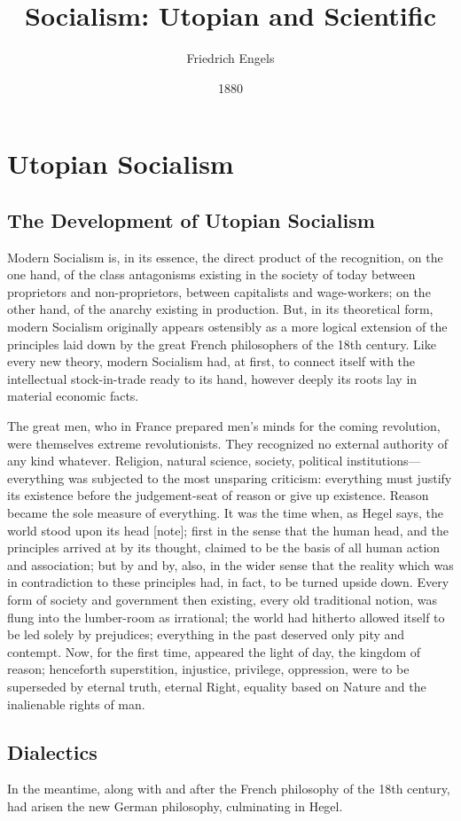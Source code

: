 \documentclass[oneside, 12pt]{book}
\title{Socialism: Utopian and Scientific}
\author{Friedrich Engels}
\date{1880}
\begin{document}
\maketitle

\tableofcontents

\part{Utopian Socialism}

\chapter{The Development of Utopian Socialism}

Modern Socialism is, in its essence, the direct product of the recognition, on
the one hand, of the class antagonisms existing in the society of today between
proprietors and non-proprietors, between capitalists and wage-workers; on the
other hand, of the anarchy existing in production. But, in its theoretical form,
modern Socialism originally appears ostensibly as a more logical extension of
the principles laid down by the great French philosophers of the 18th century.
Like every new theory, modern Socialism had, at first, to connect itself with
the intellectual stock-in-trade ready to its hand, however deeply its roots lay
in material economic facts.

The great men, who in France prepared men's minds for the coming revolution,
were themselves extreme revolutionists. They recognized no external authority of
any kind whatever. Religion, natural science, society, political
institutions---everything was subjected to the most unsparing criticism:
everything must justify its existence before the judgement-seat of reason or
give up existence. Reason became the sole measure of everything. It was the time
when, as Hegel says, the world stood upon its head [note]; first in the sense
that the human head, and the principles arrived at by its thought, claimed to be
the basis of all human action and association; but by and by, also, in the wider
sense that the reality which was in contradiction to these principles had, in
fact, to be turned upside down. Every form of society and government then
existing, every old traditional notion, was flung into the lumber-room as
irrational; the world had hitherto allowed itself to be led solely by
prejudices; everything in the past deserved only pity and contempt. Now, for the
first time, appeared the light of day, the kingdom of reason; henceforth
superstition, injustice, privilege, oppression, were to be superseded by
eternal truth, eternal Right, equality based on Nature and the inalienable
rights of man.


\chapter{Dialectics}

In the meantime, along with and after the French philosophy of the 18th century,
had arisen the new German philosophy, culminating in Hegel.
\end{document}
